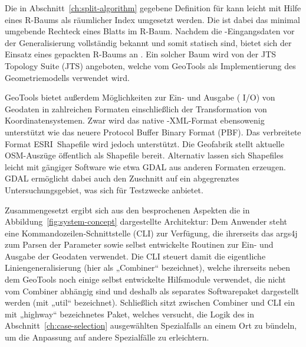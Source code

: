 \documentclass[../main/thesis.tex]{subfiles}
\begin{document}
Die in Abschnitt~\ref{ch:split-algorithm} gegebene Definition für  kann leicht mit Hilfe eines R-Baums als räumlicher Index umgesetzt werden.
Die  ist dabei das minimal umgebende Rechteck eines Blatts im R-Baum.
Nachdem die \osm-Eingangsdaten vor der Generalisierung vollständig bekannt und somit statisch sind, bietet sich der Einsatz eines gepackten R-Baums an .
Ein solcher Baum wird von der JTS Topology Suite (JTS) angeboten, welche vom  GeoTools als Implementierung des Geometriemodells verwendet wird.

GeoTools bietet außerdem Möglichkeiten zur Ein- und Ausgabe ( I/O) von Geodaten in zahlreichen Formaten einschließlich der Transformation von Koordinatensystemen.
Zwar wird das native \osm-XML-Format ebensowenig unterstützt wie das neuere Protocol Buffer Binary Format (PBF).
Das verbreitete Format ESRI~Shapefile wird jedoch unterstützt.
Die Geofabrik stellt aktuelle OSM-Auszüge öffentlich als Shapefile bereit.
Alternativ lassen sich Shapefiles leicht mit gängiger Software wie etwa GDAL aus anderen Formaten erzeugen.
GDAL ermöglicht dabei auch den Zuschnitt auf ein abgegrenztes Untersuchungsgebiet, was sich für Testzwecke anbietet.


Zusammengesetzt ergibt sich aus den besprochenen Aspekten die in Abbildung~\ref{fig:system-concept} dargestellte Architektur:
Dem Anwender steht eine Kommandozeilen-Schnittstelle (CLI) zur Verfügung, die ihrerseits das  args4j zum Parsen der Parameter sowie selbst entwickelte Routinen zur Ein- und Ausgabe der Geodaten verwendet.
Die CLI steuert damit die eigentliche Liniengeneralisierung (hier als „Combiner“ bezeichnet), welche ihrerseits neben dem  GeoTools noch einige selbst entwickelte Hilfsmodule verwendet, die nicht vom Combiner abhängig sind und deshalb als separates Softwarepaket dargestellt werden (mit „util“ bezeichnet).
Schließlich sitzt zwischen Combiner und CLI ein mit „highway“ bezeichnetes Paket, welches versucht, die Logik des in Abschnitt~\ref{ch:case-selection} ausgewählten Spezialfalls an einem Ort zu bündeln, um die Anpassung auf andere Spezialfälle zu erleichtern.
\end{document}
